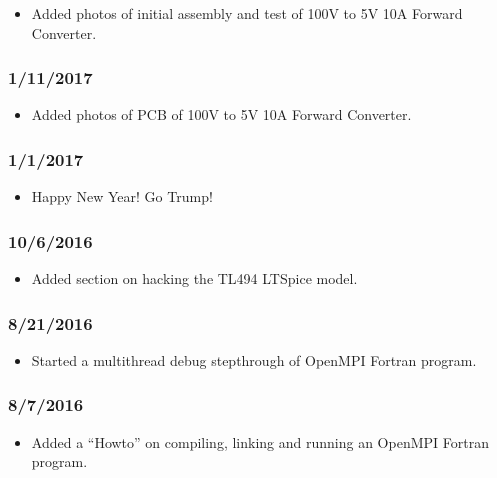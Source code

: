\begin{itemize}
\item Added photos of initial assembly and test of 100V to 5V 10A Forward Converter.
\end{itemize}

\subsubsection{1/11/2017}

\begin{itemize}
\item Added photos of PCB of 100V to 5V 10A Forward Converter.
\end{itemize}

\subsubsection{1/1/2017}

\begin{itemize}
\item Happy New Year! Go Trump!
\end{itemize}

\subsubsection{10/6/2016}

\begin{itemize}
\item Added section on hacking the TL494 LTSpice model.
\end{itemize}

\subsubsection{8/21/2016}

\begin{itemize}
\item Started a multithread debug stepthrough of OpenMPI Fortran program.
\end{itemize}

\subsubsection{8/7/2016}

\begin{itemize}
\item Added a ``Howto'' on compiling, linking and running an OpenMPI Fortran program.
\end{itemize}

